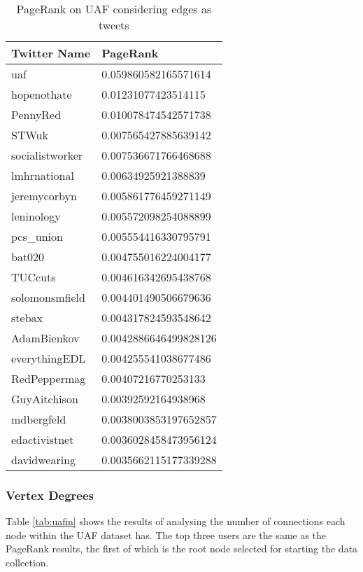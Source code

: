 \begin{table}%
\centering
\begin{tabular}{|l|l|}
\hline
Twitter Name & PageRank \\
\hline
uaf & 0.059860582165571614 \\
hopenothate & 0.01231077423514115 \\
PennyRed & 0.010078474542571738 \\
STWuk & 0.007565427885639142 \\
socialistworker & 0.007536671766468688 \\
lmhrnational & 0.00634925921388839 \\
jeremycorbyn & 0.005861776459271149 \\
leninology & 0.005572098254088899 \\
pcs\_union & 0.005554416330795791 \\
bat020 & 0.004755016224004177 \\
TUCcuts & 0.004616342695438768 \\
solomonsmfield & 0.004401490506679636 \\
stebax & 0.004317824593548642 \\
AdamBienkov & 0.0042886646499828126 \\
everythingEDL & 0.004255541038677486 \\
RedPeppermag & 0.00407216770253133 \\
GuyAitchison & 0.00392592164938968 \\
mdbergfeld & 0.0038003853197652857 \\
edactivistnet & 0.0036028458473956124 \\
davidwearing & 0.0035662115177339288 \\
\hline
\end{tabular}
\caption{PageRank on UAF considering edges as tweets}
\label{tab:uaftweetpagerank}
\end{table}

\subsubsection{Vertex Degrees}
Table \ref{tab:uafin} shows the results of analysing the number of connections each node within the UAF dataset has. The top three users are the same as the PageRank results, the first of which is the root node selected for starting the data collection.


